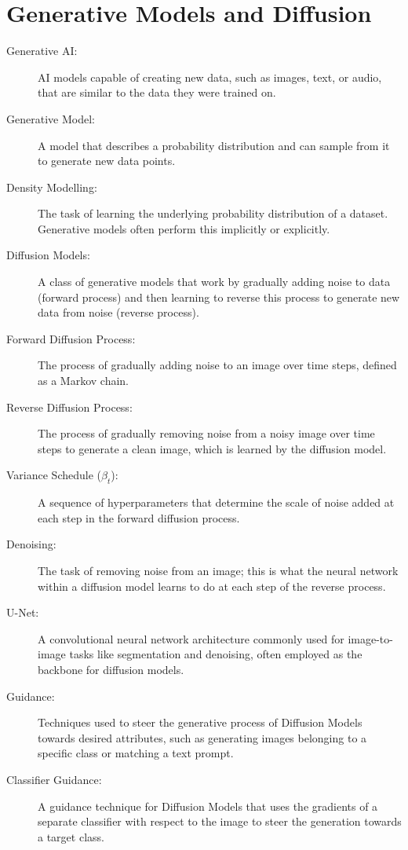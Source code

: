 \section{Generative Models and Diffusion}

\begin{description}
  \item[Generative AI:] AI models capable of creating new data, such as images, text, or audio, that are similar to the data they were trained on.
  \item[Generative Model:] A model that describes a probability distribution and can sample from it to generate new data points.
  \item[Density Modelling:] The task of learning the underlying probability distribution of a dataset. Generative models often perform this implicitly or explicitly.
  \item[Diffusion Models:] A class of generative models that work by gradually adding noise to data (forward process) and then learning to reverse this process to generate new data from noise (reverse process).
  \item[Forward Diffusion Process:] The process of gradually adding noise to an image over time steps, defined as a Markov chain.
  \item[Reverse Diffusion Process:] The process of gradually removing noise from a noisy image over time steps to generate a clean image, which is learned by the diffusion model.
  \item[Variance Schedule ($\beta_t$):] A sequence of hyperparameters that determine the scale of noise added at each step in the forward diffusion process.
  \item[Denoising:] The task of removing noise from an image; this is what the neural network within a diffusion model learns to do at each step of the reverse process.
  \item[U-Net:] A convolutional neural network architecture commonly used for image-to-image tasks like segmentation and denoising, often employed as the backbone for diffusion models.
  \item[Guidance:] Techniques used to steer the generative process of Diffusion Models towards desired attributes, such as generating images belonging to a specific class or matching a text prompt.
  \item[Classifier Guidance:] A guidance technique for Diffusion Models that uses the gradients of a separate classifier with respect to the image to steer the generation towards a target class.

\end{description}
